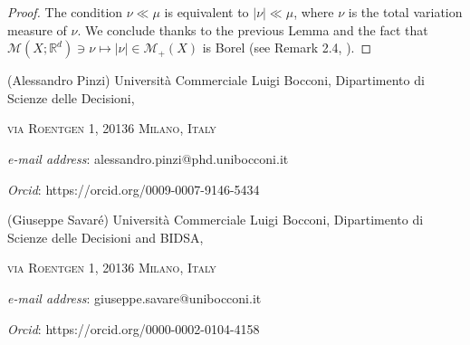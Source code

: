 \documentclass[10pt,leqno]{amsart}
\numberwithin{equation}{section}
\newcommand{\R}{\mathbb{R}}
\begin{document}
\begin{proof}
    The condition $\nu\ll\mu$ is equivalent to $|\nu|\ll\mu$, where $\nu$ is the total variation measure of $\nu$. We conclude thanks to the previous Lemma and the fact that $\mathcal{M}(X;\R^d)\ni\nu\mapsto |\nu|\in\mathcal{M}_+(X)$ is Borel (see Remark 2.4, \cite{AmIkLuPa24}).
\end{proof}














































\printbibliography

{\small
		
		\vspace{15pt} (Alessandro Pinzi) Universit\`{a} Commerciale Luigi Bocconi, Dipartimento di Scienze delle Decisioni, \par
		\textsc{via Roentgen 1, 20136 Milano, Italy}
		\par
		\textit{e-mail address}: \textsf{alessandro.pinzi@phd.unibocconi.it}
		\par
		\textit{Orcid}: \textsf{https://orcid.org/0009-0007-9146-5434}
		\par
		

        \vspace{15pt} (Giuseppe Savar\'e) Universit\`{a} Commerciale Luigi Bocconi, Dipartimento di Scienze delle Decisioni and BIDSA, \par
		\textsc{via Roentgen 1, 20136 Milano, Italy}
		\par
		\textit{e-mail address}: \textsf{giuseppe.savare@unibocconi.it}
		\par
		\textit{Orcid}: \textsf{https://orcid.org/0000-0002-0104-4158}
		\par
		
	}
\end{document}

